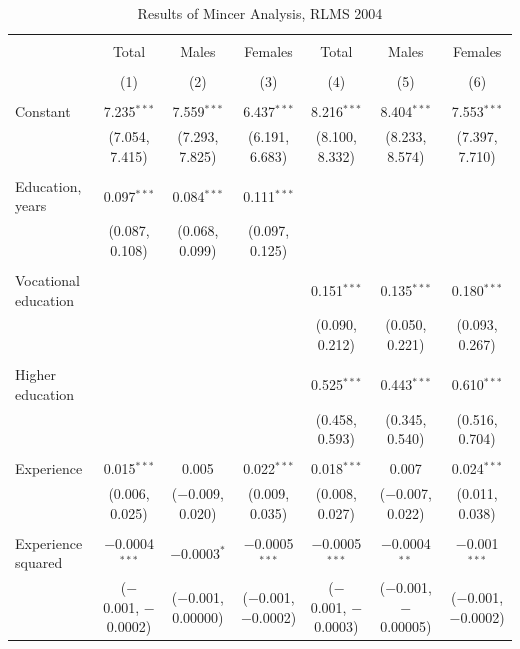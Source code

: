 \documentclass[12pt,a4paper]{article}
\numberwithin{equation}{section}
\begin{document}
\begin{landscape}
	
	\fontsize{9}{11}
	\selectfont
	
	\begin{table}[!htbp] \centering 
		\caption{Results of Mincer Analysis, RLMS 2004} 
		\label{} 
		\begin{tabular}{@{\extracolsep{5pt}}lcccccc} 
			\\[-1.8ex]\hline 
			\hline \\[-1.8ex] 
			& Total & Males & Females & Total & Males & Females \\ 
			\\[-1.8ex] & (1) & (2) & (3) & (4) & (5) & (6)\\ 
			\hline \\[-1.8ex] 
			Constant & 7.235$^{***}$ & 7.559$^{***}$ & 6.437$^{***}$ & 8.216$^{***}$ & 8.404$^{***}$ & 7.553$^{***}$ \\ 
			& (7.054, 7.415) & (7.293, 7.825) & (6.191, 6.683) & (8.100, 8.332) & (8.233, 8.574) & (7.397, 7.710) \\ 
			& & & & & & \\ 
			Education, years & 0.097$^{***}$ & 0.084$^{***}$ & 0.111$^{***}$ &  &  &  \\ 
			& (0.087, 0.108) & (0.068, 0.099) & (0.097, 0.125) &  &  &  \\ 
			& & & & & & \\ 
			Vocational education &  &  &  & 0.151$^{***}$ & 0.135$^{***}$ & 0.180$^{***}$ \\ 
			&  &  &  & (0.090, 0.212) & (0.050, 0.221) & (0.093, 0.267) \\ 
			& & & & & & \\ 
			Higher education &  &  &  & 0.525$^{***}$ & 0.443$^{***}$ & 0.610$^{***}$ \\ 
			&  &  &  & (0.458, 0.593) & (0.345, 0.540) & (0.516, 0.704) \\ 
			& & & & & & \\ 
			Experience & 0.015$^{***}$ & 0.005 & 0.022$^{***}$ & 0.018$^{***}$ & 0.007 & 0.024$^{***}$ \\ 
			& (0.006, 0.025) & ($-$0.009, 0.020) & (0.009, 0.035) & (0.008, 0.027) & ($-$0.007, 0.022) & (0.011, 0.038) \\ 
			& & & & & & \\ 
			Experience squared & $-$0.0004$^{***}$ & $-$0.0003$^{*}$ & $-$0.0005$^{***}$ & $-$0.0005$^{***}$ & $-$0.0004$^{**}$ & $-$0.001$^{***}$ \\ 
			& ($-$0.001, $-$0.0002) & ($-$0.001, 0.00000) & ($-$0.001, $-$0.0002) & ($-$0.001, $-$0.0003) & ($-$0.001, $-$0.00005) & ($-$0.001, $-$0.0002) \\ 

\end{tabular}
\end{table}
\end{landscape}
\end{document}

